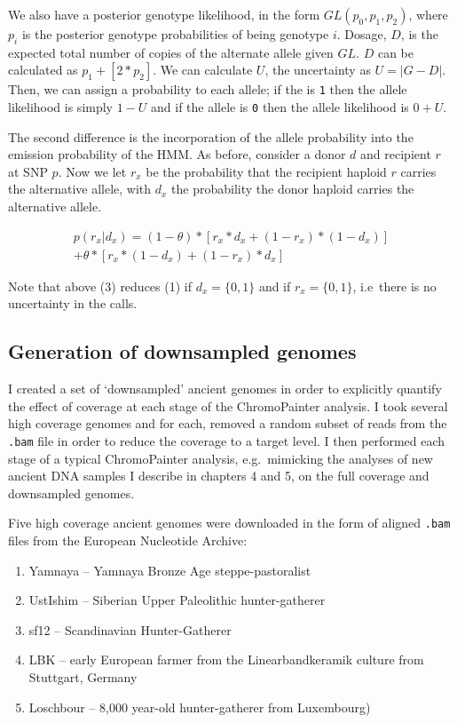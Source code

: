 We also have a posterior genotype likelihood, in the form $GL(p_{0}, p_{1}, p_{2})$, where $p_i$ is the posterior genotype probabilities of being genotype $i$. Dosage, $D$, is the expected total number of copies of the alternate allele given $GL$. $D$ can be calculated as $p_{1} + [2*p_{2}]$. We can calculate $U$, the uncertainty as $U = |G-D|$. Then, we can assign a probability to each allele; if the is \texttt{1} then the allele likelihood is simply $1 - U$ and if the allele is \texttt{0} then the allele likelihood is $0 + U$.
                 
The second difference is the incorporation of the allele probability into the emission probability of the HMM. As before, consider a donor $d$ and recipient $r$ at SNP $p$. Now we let $r_x$ be the probability that the recipient haploid $r$ carries the alternative allele, with $d_x$ the probability the donor haploid carries the alternative allele.

\begin{equation}
\begin{split}
p(r_{x} | d_{x}) = (1-\theta)*[r_{x}*d_{x} + (1-r_{x}) * (1-d_{x})] \\ + \theta * [r_{x}*(1-d_{x}) + (1-r_{x})*d_{x}]
\end{split}
\end{equation}

Note that above (3) reduces (1) if $d_{x} = \{0,1\}$ and if $r_{x} = \{0,1\}$, i.e\ there is no uncertainty in the calls.


\subsection{Generation of downsampled genomes}

I created a set of `downsampled' ancient genomes in order to explicitly quantify the effect of coverage at each stage of the ChromoPainter analysis. I took several high coverage genomes and for each, removed a random subset of reads from the \texttt{.bam} file in order to reduce the coverage to a target level. I then performed each stage of a typical ChromoPainter analysis, e.g.\ mimicking the analyses of new ancient DNA samples I describe in chapters 4 and 5, on the full coverage and downsampled genomes.

Five high coverage ancient genomes were downloaded in the form of aligned \texttt{.bam} files from the European Nucleotide Archive:

\begin{enumerate}
\item Yamnaya -- Yamnaya Bronze Age steppe-pastoralist \cite{deBarrosDamgaardeaar7711}
\item UstIshim -- Siberian Upper Paleolithic hunter-gatherer \cite{Fu2014}
\item sf12 -- Scandinavian Hunter-Gatherer \cite{Gunther2018a}
\item LBK -- early European farmer from the Linearbandkeramik culture from Stuttgart, Germany \cite{Lazaridis2014}
\item Loschbour -- 8,000 year-old hunter-gatherer from Luxembourg) \cite{Lazaridis2014}
\end{enumerate}

